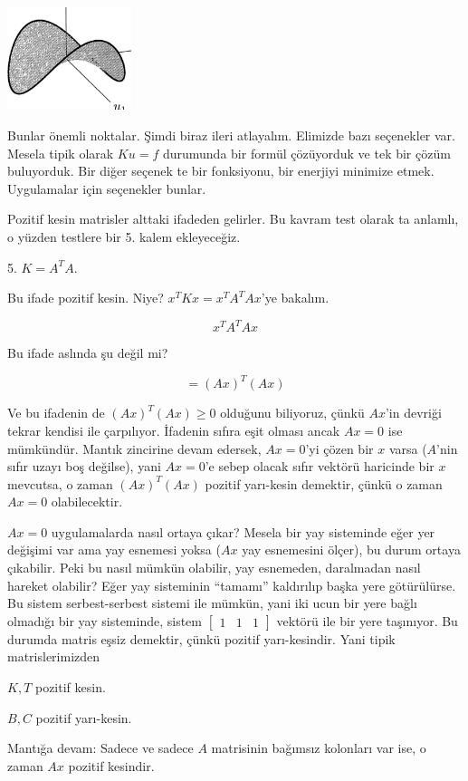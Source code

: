 \documentclass[12pt,fleqn]{article}\usepackage{../../common}
\begin{document}
\includegraphics[height=3cm]{7_6.png}

Bunlar önemli noktalar. Şimdi biraz ileri atlayalım. Elimizde bazı
seçenekler var. Mesela tipik olarak $Ku = f$ durumunda bir formül
çözüyorduk ve tek bir çözüm buluyorduk. Bir diğer seçenek te bir
fonksiyonu, bir enerjiyi minimize etmek. Uygulamalar için seçenekler
bunlar. 

Pozitif kesin matrisler alttaki ifadeden gelirler. Bu kavram test olarak ta
anlamlı, o yüzden testlere bir 5. kalem ekleyeceğiz. 

5. $K = A^TA$. 

Bu ifade pozitif kesin. Niye? $x^TKx = x^TA^TAx$'ye bakalım.

$$ x^TA^TAx $$

Bu ifade aslında şu değil mi?

$$ = (Ax)^T(Ax) $$

Ve bu ifadenin de $(Ax)^T(Ax) \ge 0$ olduğunu biliyoruz, çünkü $Ax$'in
devriği tekrar kendisi ile çarpılıyor. İfadenin sıfıra eşit olması ancak
$Ax=0$ ise mümkündür. Mantık zincirine devam edersek, $Ax=0$'yi çözen bir
$x$ varsa ($A$'nin sıfır uzayı boş değilse), yani $Ax=0$'e sebep olacak
sıfır vektörü haricinde bir $x$ mevcutsa, o zaman $(Ax)^T(Ax)$ pozitif
yarı-kesin demektir, çünkü o zaman $Ax=0$ olabilecektir. 

$Ax=0$ uygulamalarda nasıl ortaya çıkar? Mesela bir yay sisteminde eğer yer
değişimi var ama yay esnemesi yoksa ($Ax$ yay esnemesini ölçer), bu durum ortaya
çıkabilir. Peki bu nasıl mümkün olabilir, yay esnemeden, daralmadan nasıl
hareket olabilir?  Eğer yay sisteminin ``tamamı'' kaldırılıp başka yere
götürülürse. Bu sistem serbest-serbest sistemi ile mümkün, yani iki ucun bir
yere bağlı olmadığı bir yay sisteminde, sistem
$\left[\begin{array}{ccc}1&1&1\end{array}\right]$ vektörü ile bir yere
taşınıyor. Bu durumda matris eşsiz demektir, çünkü pozitif yarı-kesindir. Yani
tipik matrislerimizden

$K,T$ pozitif kesin. 

$B, C$ pozitif yarı-kesin. 

Mantığa devam: Sadece ve sadece $A$ matrisinin bağımsız kolonları var ise,
o zaman $Ax$ pozitif kesindir. 
\end{document}
